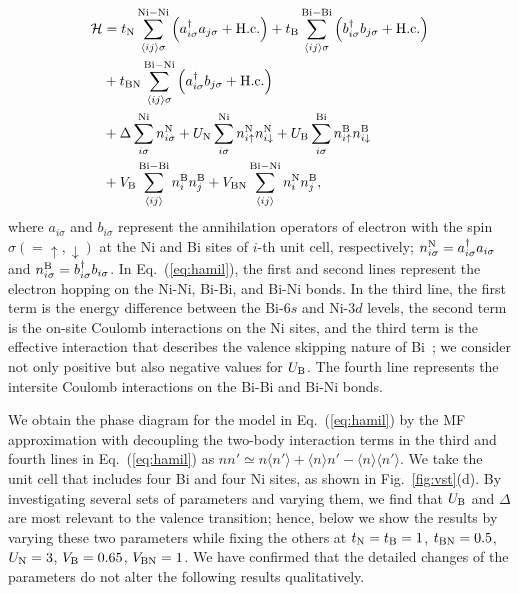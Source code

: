 \documentclass[aps,twocolumn,prl,showpacs,preprintnumbers,amsmath,amssymb]{revtex4}
\begin{document}
\begin{align}
{\cal H} &= t_{\rm N} \sum_{\langle ij \rangle \sigma}^{\rm Ni-Ni} \left( a^{\dagger}_{i \sigma} a_{j \sigma} + {\rm H.c.} \right) + t_{\rm B} \sum_{\langle ij \rangle \sigma}^{\rm Bi-Bi} \left( b^{\dagger}_{i \sigma} b_{j \sigma}+ {\rm H.c.} \right) \notag \\
&+ t_{\rm BN} \sum_{\langle ij \rangle \sigma}^{\rm Bi-Ni} \left( a^{\dagger}_{i \sigma} b_{j \sigma} + {\rm H.c.} \right) \notag \\ 
&+ {\Delta} \sum_{i \sigma}^{\rm Ni} n^{\rm N}_{i \sigma} + U_{\rm N} \sum_{i \sigma}^{\rm Ni} n^{\rm N}_{i \uparrow} n^{\rm N}_{i \downarrow} + U_{\rm B} \sum_{i \sigma}^{\rm Bi} n^{\rm B}_{i \uparrow} n^{\rm B}_{i \downarrow} \notag \\
&+ V_{\rm B} \sum_{\langle ij \rangle}^{\rm Bi-Bi} n^{\rm B}_{i} n^{\rm B}_{j} + V_{\rm BN} \sum_{\langle ij \rangle}^{\rm Bi-Ni} n^{\rm N}_{i} n^{\rm B}_{j}, 
\label{eq:hamil}
\end{align}
where $a_{i \sigma}$ and $b_{i \sigma}$ represent the annihilation operators of electron with the spin $\sigma(=\uparrow, \downarrow)$ at the Ni and Bi sites of $i$-th unit cell, respectively; 
$n^{\rm N}_{i \sigma} = a^{\dagger}_{i \sigma} a_{i \sigma}$ and $n^{\rm B}_{i \sigma} = b^{\dagger}_{i \sigma} b_{i \sigma}$. 
In Eq.~(\ref{eq:hamil}), the first and second lines represent the electron hopping on the Ni-Ni, Bi-Bi, and Bi-Ni bonds. 
In the third line, the first term is the energy difference between the Bi-$6s$ and Ni-$3d$ levels, the second term is the on-site Coulomb interactions on the Ni sites, and the third term is the effective interaction that describes the valence skipping nature of Bi~\cite{Varma, Anderson, Hase}; we consider not only positive but also negative values for $U_{\rm B}$. 
The fourth line represents the intersite Coulomb interactions on the Bi-Bi and Bi-Ni bonds. 

We obtain the phase diagram for the model in Eq.~(\ref{eq:hamil}) by the MF approximation with decoupling the two-body interaction terms in the third and fourth lines in Eq.~(\ref{eq:hamil}) as $n n' \simeq n \langle n' \rangle + \langle n \rangle n' - \langle n \rangle \langle n' \rangle$. 
We take the unit cell that includes four Bi and four Ni sites, as shown in Fig.~\ref{fig:vst}(d). 
By investigating several sets of parameters and varying them, we find that $U_{\rm B}$ and $\Delta$ are most relevant to the valence transition; hence, below we show the results by varying these two parameters while fixing the others at $t_{\rm N} = t_{\rm B} = 1$, $t_{\rm BN} = 0.5$, $U_{\rm N} = 3$, $V_{\rm B} = 0.65$, $V_{\rm BN} = 1$. 
We have confirmed that the detailed changes of the parameters do not alter the following results qualitatively. 
\end{document}
